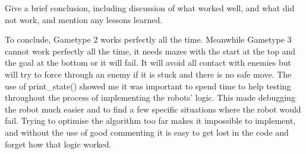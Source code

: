 \documentclass{cs255}
\begin{document}
Give a brief conclusion, including discussion of what worked well, and what did not work, and mention any lessons learned. 

To conclude, Gametype 2 works perfectly all the time.
Meanwhile Gametype 3 cannot work perfectly all the time, it needs mazes with the start at the top and the goal at the bottom or it will fail.
It will avoid all contact with enemies but will try to force through an enemy if it is stuck and there is no safe move.
The use of print\_state() showed me it was important to spend time to help testing throughout the process of implementing the robots' logic.
This made debugging the robot much easier and to find a few specific situations where the robot would fail.
Trying to optimise the algorithm too far makes it impossible to implement, and without the use of good commenting it is easy to get lost in the code and forget how that logic worked.




%
\end{document}
